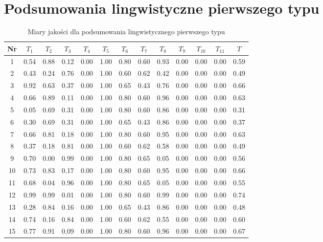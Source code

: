 \documentclass{article}
\begin{document}
\section{Podsumowania lingwistyczne pierwszego typu}
    \begin{table}[h!]
    \centering
    \begin{tabular}{|c|c|c|c|c|c|c|c|c|c|c|c|c|}
    \hline
    \textbf{Nr} & \textbf{\(T_1\)} &\textbf{\(T_2\)} & \textbf{\(T_3\)} & \textbf{\(T_4\)} & \textbf{\(T_5\)} & \textbf{\(T_6\)} & \textbf{\(T_7\)} & \textbf{\(T_8\)} & \textbf{\(T_9\)} & \textbf{\(T_{10}\)} & \textbf{\(T_{11}\)} & \textbf{\(T\)} \\ \hline
    1 & 0.54 & 0.88 & 0.12 & 0.00 & 1.00 & 0.80 & 0.60 & 0.93 & 0.00 & 0.00 & 0.00 & 0.59 \\
    \hline
    2 & 0.43 & 0.24 & 0.76 & 0.00 & 1.00 & 0.60 & 0.62 & 0.42 & 0.00 & 0.00 & 0.00 & 0.49 \\
    \hline
    3 & 0.92 & 0.63 & 0.37 & 0.00 & 1.00 & 0.65 & 0.43 & 0.76 & 0.00 & 0.00 & 0.00 & 0.66 \\
    \hline
    4 & 0.66 & 0.89 & 0.11 & 0.00 & 1.00 & 0.80 & 0.60 & 0.96 & 0.00 & 0.00 & 0.00 & 0.63 \\
    \hline
    5 & 0.05 & 0.69 & 0.31 & 0.00 & 1.00 & 0.80 & 0.60 & 0.86 & 0.00 & 0.00 & 0.00 & 0.31 \\
    \hline
    6 & 0.30 & 0.69 & 0.31 & 0.00 & 1.00 & 0.65 & 0.43 & 0.86 & 0.00 & 0.00 & 0.00 & 0.37 \\
    \hline
    7 &  0.66 & 0.81 & 0.18 & 0.00 & 1.00 & 0.80 & 0.60 & 0.95 & 0.00 & 0.00 & 0.00 & 0.63 \\
    \hline
    8 & 0.37 & 0.18 & 0.81 & 0.00 & 1.00 & 0.60 & 0.62 & 0.58 & 0.00 & 0.00 & 0.00 & 0.49 \\
    \hline
    9 & 0.70 & 0.00 & 0.99 & 0.00 & 1.00 & 0.80 & 0.65 & 0.05 & 0.00 & 0.00 & 0.00 & 0.56 \\
    \hline
    10 & 0.73 & 0.83 & 0.17 & 0.00 & 1.00 & 0.80 & 0.60 & 0.95 & 0.00 & 0.00 & 0.00 & 0.66 \\
    \hline
    11 & 0.68 & 0.04 & 0.96 & 0.00 & 1.00 & 0.80 & 0.65 & 0.05 & 0.00 & 0.00 & 0.00 & 0.55 \\
    \hline
    12 & 0.99 & 0.99 & 0.01 & 0.00 & 1.00 & 0.80 & 0.60 & 0.99 & 0.00 & 0.00 & 0.00 & 0.74 \\
    \hline
    13 & 0.28 & 0.84 & 0.16 & 0.00 & 1.00 & 0.65 & 0.43 & 0.86 & 0.00 & 0.00 & 0.00 & 0.48 \\
    \hline
    14 & 0.74 & 0.16 & 0.84 & 0.00 & 1.00 & 0.60 & 0.62 & 0.55 & 0.00 & 0.00 & 0.00 & 0.60 \\
    \hline
    15 & 0.77 & 0.91 & 0.09 & 0.00 & 1.00 & 0.80 & 0.60 & 0.96 & 0.00 & 0.00 & 0.00 & 0.67 \\
    \hline
    \end{tabular}
    \caption{Miary jakości dla podsumowania lingwistycznego pierwszego typu}
    \end{table}
\end{document}

